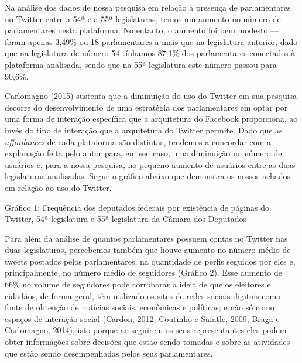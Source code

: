 Na análise dos dados de nossa pesquisa em relação à presença de
parlamentares no Twitter entre a 54ª e a 55ª legislaturas, temos um
aumento no número de parlamentares nesta plataforma. No entanto, o
aumento foi bem modesto --- foram apenas 3,49\% ou 18 parlamentares a mais
que na legislatura anterior, dado que na legislatura de número 54
tínhamos 87,1\% dos parlamentares conectados à plataforma analisada,
sendo que na 55ª legislatura este número passou para 90,6\%.

Carlomagno (2015) sustenta que a diminuição do uso do Twitter em sua
pesquisa decorre do desenvolvimento de uma estratégia dos parlamentares
em optar por uma forma de interação específica que a arquitetura do
Facebook proporciona, ao invés do tipo de interação que a arquitetura do
Twitter permite. Dado que as \emph{affordances} de cada plataforma são
distintas, tendemos a concordar com a explanação feita pelo autor para,
em seu caso, uma diminuição no número de usuários e, para a nossa
pesquisa, no pequeno aumento de usuários entre as duas legislaturas
analisadas. Segue o gráfico abaixo que demonstra os nossos achados em
relação ao uso do Twitter.

\pagebreak

\begin{center}
Gráfico 1: Frequência dos deputados federais por existência de páginas
do Twitter, 54ª legislatura e 55ª legislatura da Câmara dos Deputados
\end{center}


Para além da análise de quantos parlamentares possuem contas no Twitter
nas duas legislaturas, percebemos também que houve aumento no número
médio de tweets postados pelos parlamentares, na quantidade de perfis
seguidos por eles e, principalmente, no número médio de seguidores
(Gráfico 2). Esse aumento de 66\% no volume de seguidores pode
corroborar a ideia de que os eleitores e cidadãos, de forma geral, têm
utilizado os sites de redes sociais digitais como fonte de obtenção de
notícias sociais, econômicas e políticas; e não só como espaços de
interação social (Cardon, 2012; Coutinho e Safatle, 2009; Braga e
Carlomagno, 2014), isto porque ao seguirem os seus representantes eles
podem obter informações sobre decisões que estão sendo tomadas e sobre
as atividades que estão sendo desempenhadas pelos seus parlamentares.

